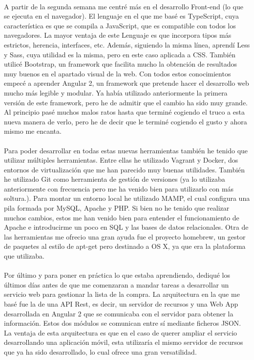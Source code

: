 \documentclass[11pt, a4paper,spanish]{article}
\begin{document}
                \paragraph{}
                A partir de la segunda semana me centré más en el desarrollo Front-end (lo que se ejecuta en el navegador). El lenguaje en el que me basé es TypeScript, cuya característica es que se compila a JavaScript, que es compatible con todos los navegadores. La mayor ventaja de este Lenguaje es que incorpora tipos más estrictos, herencia, interfaces, etc. Además, siguiendo la misma línea, aprendí Less y Sass, cuya utilidad es la misma, pero en este caso aplicada a CSS. También utilicé Bootstrap, un framework que facilita mucho la obtención de resultados muy buenos en el apartado visual de la web. Con todos estos conocimientos empecé a aprender Angular 2, un framework que pretende hacer el desarrollo web mucho más legible y modular. Ya había utilizado anteriormente la primera versión de este framework, pero he de admitir que el cambio ha sido muy grande. Al principio pasé muchos malos ratos hasta que terminé cogiendo el truco a esta nueva manera de verlo, pero he de decir que le terminé cogiendo el gusto y ahora mismo me encanta.

                \paragraph{}
                Para poder desarrollar en todas estas nuevas herramientas también he tenido que utilizar múltiples herramientas. Entre ellas he utilizado Vagrant y Docker, dos entornos de virtualización que me han parecido muy buenas utilidades. También he utilizado Git como herramienta de gestión de versiones (ya lo utilizaba anteriormente con frecuencia pero me ha venido bien para utilizarlo con más soltura.). Para montar un entorno local he utilizado MAMP, el cual configura una pila formada por MySQL, Apache y PHP. Si bien no he tenido que realizar muchos cambios, estos me han venido bien para entender el funcionamiento de Apache e introducirme un poco en SQL y las bases de datos relacionales. Otra de las herramientas me ofrecio una gran ayuda fue el proyecto homebrew, un gestor de paquetes al estilo de apt-get pero destinado a OS X, ya que era la plataforma que utilizaba.

                \paragraph{}
                Por último y para poner en práctica lo que estaba aprendiendo, dediqué los últimos días antes de que me comenzaran a mandar tareas a desarrollar un servicio web para gestionar la lista de la compra. La arquitectura en la que me basé fue la de una API Rest, es decir, un servidor de recursos y una Web App desarrollada en Angular 2 que se comunicaba con el servidor para obtener la información. Estos dos módulos se comunican entre sí mediante ficheros JSON. La ventaja de esta arquitectura es que en el caso de querer ampliar el servicio desarrollando una aplicación móvil, esta utilizaría el mismo servidor de recursos que ya ha sido desarrollado, lo cual ofrece una gran versatilidad.
\end{document}
